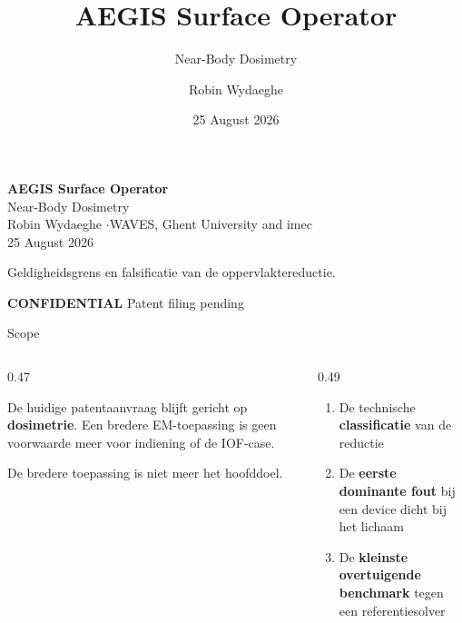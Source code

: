 \documentclass[aspectratio=169,10pt]{beamer}
\title{AEGIS Surface Operator}
\subtitle{Near-Body Dosimetry}
\author{Robin Wydaeghe}
\institute{WAVES, Ghent University and imec}
\date{25 August 2026}
\begin{document}
\begin{frame}[plain]
  \vfill
  \begin{center}
    {\Large\color{navyblue}\bfseries AEGIS Surface Operator}\\[7pt]
    {\normalsize Near-Body Dosimetry}\\[17pt]
    {\small Robin Wydaeghe \quad$\cdot$\quad WAVES, Ghent University and imec}\\[3pt]
    {\footnotesize 25 August 2026}
  \end{center}
  \vspace{11pt}
  \begin{center}
    {\small\color{darkgray}Geldigheidsgrens en falsificatie van de oppervlaktereductie.}
  \end{center}
  \vfill
  \begin{center}{\footnotesize\color{alertred}\textbf{CONFIDENTIAL} \quad Patent filing pending}\end{center}
\end{frame}

\begin{frame}{Scope}
  \vspace{3pt}
  \begin{columns}[T]
    \begin{column}{0.47\textwidth}
      \begin{resultbox}
        \small
        De huidige patentaanvraag blijft gericht op \textbf{dosimetrie}. Een bredere EM-toepassing is geen voorwaarde meer voor indiening of de IOF-case.
      \end{resultbox}
      \vspace{8pt}
      {\small\color{darkgray}De bredere toepassing is niet meer het hoofddoel.}
    \end{column}
    \begin{column}{0.49\textwidth}
      \begin{questionbox}
        \begin{enumerate}\small\setlength\itemsep{5pt}
          \item De technische \textbf{classificatie} van de reductie
          \item De \textbf{eerste dominante fout} bij een device dicht bij het lichaam
          \item De \textbf{kleinste overtuigende benchmark} tegen een referentiesolver
        \end{enumerate}
      \end{questionbox}
    \end{column}
  \end{columns}
  \vspace{8pt}
\end{frame}
\end{document}
